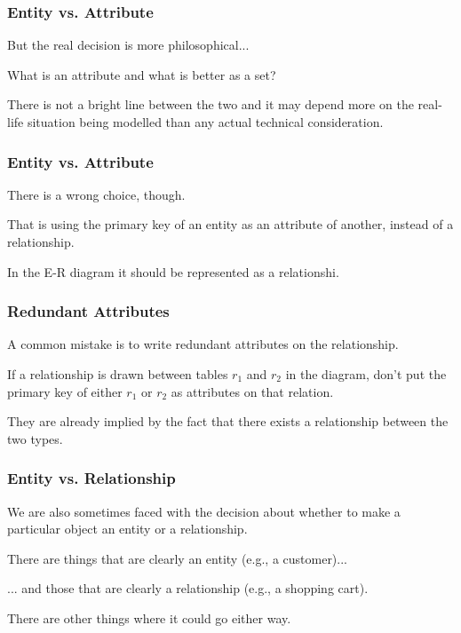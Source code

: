 \begin{frame}
\frametitle{Entity vs. Attribute}

But the real decision is more philosophical... 

What is an attribute and what is better as a set? 

There is not a bright line between the two and it may depend more on the real-life situation being modelled than any actual technical consideration.


\end{frame}



\begin{frame}
\frametitle{Entity vs. Attribute}

There is a wrong choice, though. 

That is using the primary key of an entity as an attribute of another, instead of a relationship. 

In the E-R diagram it should be represented as a relationshi.

\end{frame}



\begin{frame}
\frametitle{Redundant Attributes}

A common mistake is to write redundant attributes on the relationship. 

If a relationship is drawn between tables $r_{1}$ and $r_{2}$ in the diagram, don't put the primary key of either $r_{1}$ or $r_{2}$ as attributes on that relation.

They are already implied by the fact that there exists a relationship between the two types. 

\end{frame}



\begin{frame}
\frametitle{Entity vs. Relationship}

We are also sometimes faced with the decision about whether to make a particular object an entity or a relationship. 

There are things that are clearly an entity (e.g., a customer)...

... and those that are clearly a relationship (e.g., a shopping cart).

There are other things where it could go either way. 

\end{frame}



